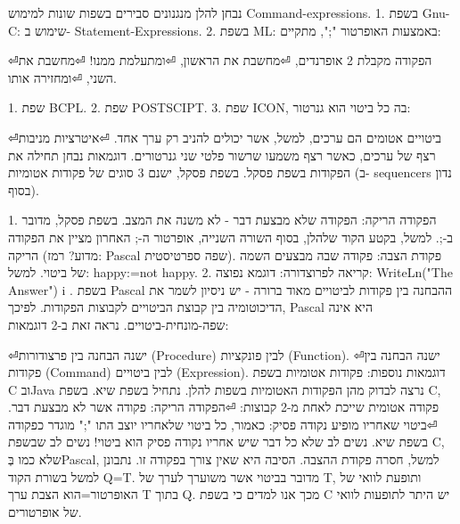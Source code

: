         נבחן להלן מנגנונים סבירים בשפות שונות למימוש Command-expressions.
        1. בשפת Gnu-C: שימוש ב- Statement-Expressions.
        2. בשפת ML: באמצעות האופרטור ";", מתקיים:
        \begin{ציינון}
⏎הפקודה מקבלת 2 אופרנדים,
⏎מחשבת את הראשון,
⏎ומתעלמת ממנו!
⏎מחשבת את השני,
⏎ומחזירה אותו.
      \end{ציינון}

        1. שפת BCPL.
        2. שפת POSTSCIPT.
        3. שפת ICON, בה כל ביטוי הוא גנרטור:
        \begin{ציינון}
⏎ביטויים אטומים הם ערכים, למשל, אשר יכולים להניב רק ערך אחד.
⏎איטרציות מניבות רצף של ערכים, כאשר רצף משמעו שרשור פלטי שני גנרטורים.
        דוגמאות
        נבחן תחילה את הפקודות בשפת פסקל.
        בשפת פסקל, ישנם 3 סוגים של פקודות אטומיות (ב- sequencers נדון בסוף).
    \end{ציינון}

        1. הפקודה הריקה: הפקודה שלא מבצעת דבר - לא משנה את המצב. בשפת פסקל, מדובר ב-;. למשל, בקטע הקוד שלהלן, בסוף השורה השנייה, אופרטור ה-; האחרון מציין את הפקודה הריקה (מדוע? רמז: Pascal שפה ספרטיסטית). פקודת הצבה: פקודה שבה מבצעים השמה של ביטוי. למשל: happy:=not happy.
        2. קריאה לפרוצדורה: דוגמא נפוצה: WriteLn("The Answer") i .
        בשפת Pascal ההבחנה בין פקודות לביטויים מאוד ברורה - יש ניסיון לשמר את הדיכוטומיה בין קבוצת הביטויים לקבוצות הפקודות. לפיכך, Pascal היא אינה שפה-מונחית-ביטויים. נראה זאת ב-2 דוגמאות:
        \begin{ציינון}
⏎ישנה הבחנה בין פרצודורות (Procedure) לבין פונקציות (Function).
⏎ישנה הבחנה בין פקודות (Command) לבין ביטויים (Expression).
        דוגמאות נוספות: פקודות אטומיות בשפת C ובJava
        נרצה לבדוק מהן הפקודות האטומיות בשפות להלן. נתחיל בשפת שיא.
        בשפת C, פקודה אטומית שייכת לאחת מ-2 קבוצות:
⏎הפקודה הריקה: פקודה אשר לא מבצעת דבר.
⏎ביטוי שאחריו מופיע נקודה פסיק: כאמור, כל ביטוי שלאחריו יוצב התו ";" מוגדר כפקודה בשפת שיא. נשים לב שלא כל דבר שיש אחריו נקודה פסיק הוא ביטוי!
        נשים לב שבשפת C, שלא כמו בְּPascal, למשל, חסרה פקודת ההצבה. הסיבה היא שאין צורך בפקודה זו. נתבונן למשל בשורת הקוד Q=T. מדובר בביטוי אשר משוערך לערך של T, ותופעת לוואי של האופרטור=הוא הצבת ערך T בתוך Q. מכך אנו למדים כי בשפת C יש היתר לתופעות לוואי של אופרטורים.
    \end{ציינון}

